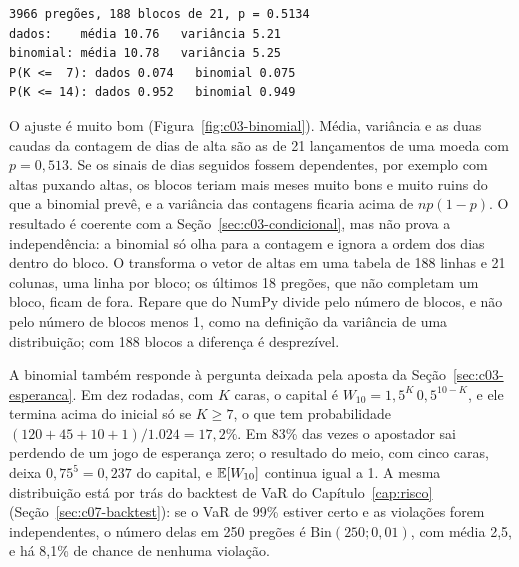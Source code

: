
\begin{lstlisting}[style=saida]
3966 pregões, 188 blocos de 21, p = 0.5134
dados:    média 10.76   variância 5.21
binomial: média 10.78   variância 5.25
P(K <=  7): dados 0.074   binomial 0.075
P(K <= 14): dados 0.952   binomial 0.949
\end{lstlisting}

O ajuste é muito bom (Figura~\ref{fig:c03-binomial}). Média, variância e as duas caudas da contagem de dias de alta são as de 21 lançamentos de uma moeda com $p = 0,513$. Se os sinais de dias seguidos fossem dependentes, por exemplo com altas puxando altas, os blocos teriam mais meses muito bons e muito ruins do que a binomial prevê, e a variância das contagens ficaria acima de $np(1-p)$. O resultado é coerente com a Seção~\ref{sec:c03-condicional}, mas não prova a independência: a binomial só olha para a contagem e ignora a ordem dos dias dentro do bloco. O  transforma o vetor de altas em uma tabela de 188 linhas e 21 colunas, uma linha por bloco; os últimos 18 pregões, que não completam um bloco, ficam de fora. Repare que  do NumPy divide pelo número de blocos, e não pelo número de blocos menos 1, como na definição da variância de uma distribuição; com 188 blocos a diferença é desprezível.


A binomial também responde à pergunta deixada pela aposta da Seção~\ref{sec:c03-esperanca}. Em dez rodadas, com $K$ caras, o capital é $W_{10} = 1,5^K\,0,5^{10-K}$, e ele termina acima do inicial só se $K \ge 7$, o que tem probabilidade $(120 + 45 + 10 + 1)/1.024 = 17,2\%$. Em 83\% das vezes o apostador sai perdendo de um jogo de esperança zero; o resultado do meio, com cinco caras, deixa $0,75^5 = 0,237$ do capital, e $\operatorname{\mathbb{E}}[W_{10}]$ continua igual a 1. A mesma distribuição está por trás do backtest de VaR do Capítulo~\ref{cap:risco} (Seção~\ref{sec:c07-backtest}): se o VaR de 99\% estiver certo e as violações forem independentes, o número delas em 250 pregões é $\mathrm{Bin}(250; 0,01)$, com média 2,5, e há 8,1\% de chance de nenhuma violação.

